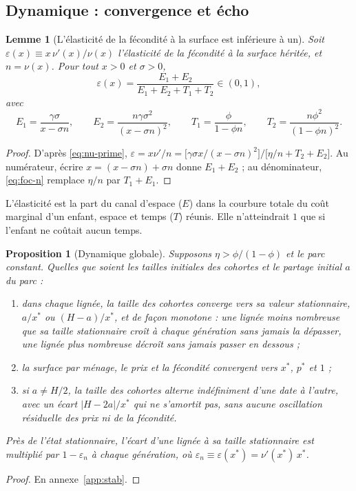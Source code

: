 \documentclass[11pt,a4paper]{article}
\theoremstyle{plain}
\newtheorem{proposition}{Proposition}
\newtheorem{lemme}{Lemme}
\theoremstyle{definition}
\newcommand{\eps}{\varepsilon}
\begin{document}
\subsection{Dynamique : convergence et écho}

\begin{lemme}[L'élasticité de la fécondité à la surface est inférieure à un]\label{lem:eps}
Soit $\eps(x) \equiv x\,\nu'(x)/\nu(x)$ l'élasticité de la fécondité à la surface héritée, et $n = \nu(x)$. Pour tout $x > 0$ et $\sigma > 0$,
\begin{equation}\label{eq:eps}
\eps(x) = \frac{E_1 + E_2}{E_1 + E_2 + T_1 + T_2} \in (0,1),
\end{equation}
avec
\[
E_1 = \frac{\gamma\sigma}{x-\sigma n},\qquad
E_2 = \frac{n\gamma\sigma^2}{(x-\sigma n)^2},\qquad
T_1 = \frac{\phi}{1-\phi n},\qquad
T_2 = \frac{n\phi^2}{(1-\phi n)^2} .
\]
\end{lemme}
\begin{proof}
D'après \eqref{eq:nu-prime}, $\eps = x\nu'/n = \big[\gamma\sigma x/(x-\sigma n)^2\big] \big/ \big[\eta/n + T_2 + E_2\big]$. Au numérateur, écrire $x = (x-\sigma n) + \sigma n$ donne $E_1 + E_2$ ; au dénominateur, \eqref{eq:foc-n} remplace $\eta/n$ par $T_1 + E_1$.
\end{proof}

L'élasticité est la part du canal d'espace ($E$) dans la courbure totale du coût marginal d'un enfant, espace et temps ($T$) réunis. Elle n'atteindrait $1$ que si l'enfant ne coûtait aucun temps.

\begin{proposition}[Dynamique globale]\label{prop:stab}
Supposons $\eta > \phi/(1-\phi)$ et le parc constant. Quelles que soient les tailles initiales des cohortes et le partage initial $a$ du parc :
\begin{enumerate}
\item[(i)] dans chaque lignée, la taille des cohortes converge vers sa valeur stationnaire, $a/x^*$ ou $(H-a)/x^*$, et de façon monotone : une lignée moins nombreuse que sa taille stationnaire croît à chaque génération sans jamais la dépasser, une lignée plus nombreuse décroît sans jamais passer en dessous ;
\item[(ii)] la surface par ménage, le prix et la fécondité convergent vers $x^*$, $p^*$ et $1$ ;
\item[(iii)] si $a \neq H/2$, la taille des cohortes alterne indéfiniment d'une date à l'autre, avec un écart $|H-2a|/x^*$ qui ne s'amortit pas, sans aucune oscillation résiduelle des prix ni de la fécondité.
\end{enumerate}
Près de l'état stationnaire, l'écart d'une lignée à sa taille stationnaire est multiplié par $1 - \eps_n$ à chaque génération, où $\eps_n \equiv \eps(x^*) = \nu'(x^*)\,x^*$.
\end{proposition}
\begin{proof}
En annexe~\ref{app:stab}.
\end{proof}
\end{document}
